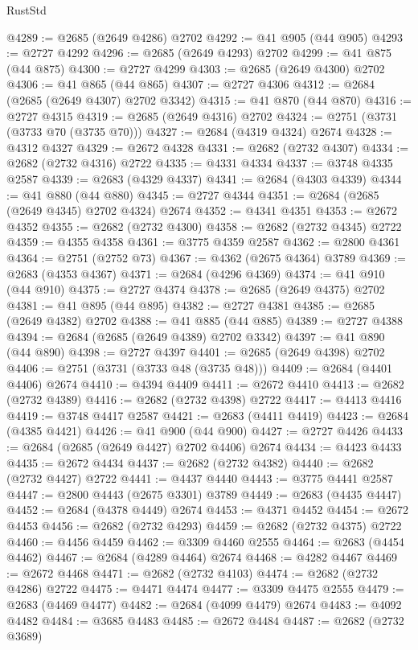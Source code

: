 \begin{lexlean}{RustStd}
\begin{coremodule}
{\begin{coremodule}
{{{{{{{{{{{{{{{{{{{{{{{{{{@4289 := @2685 (@2649 @4286) @2702
@4292 := @41 @905 (@44 @905)
@4293 := @2727 @4292
@4296 := @2685 (@2649 @4293) @2702
@4299 := @41 @875 (@44 @875)
@4300 := @2727 @4299
@4303 := @2685 (@2649 @4300) @2702
@4306 := @41 @865 (@44 @865)
@4307 := @2727 @4306
@4312 := @2684 (@2685 (@2649 @4307) @2702 @3342)
@4315 := @41 @870 (@44 @870)
@4316 := @2727 @4315
@4319 := @2685 (@2649 @4316) @2702
@4324 := @2751 (@3731 (@3733 @70 (@3735 @70)))
@4327 := @2684 (@4319 @4324) @2674
@4328 := @4312 @4327
@4329 := @2672 @4328
@4331 := @2682 (@2732 @4307)
@4334 := @2682 (@2732 @4316) @2722
@4335 := @4331 @4334
@4337 := @3748 @4335 @2587
@4339 := @2683 (@4329 @4337)
@4341 := @2684 (@4303 @4339)
@4344 := @41 @880 (@44 @880)
@4345 := @2727 @4344
@4351 := @2684 (@2685 (@2649 @4345) @2702 @4324) @2674
@4352 := @4341 @4351
@4353 := @2672 @4352
@4355 := @2682 (@2732 @4300)
@4358 := @2682 (@2732 @4345) @2722
@4359 := @4355 @4358
@4361 := @3775 @4359 @2587
@4362 := @2800 @4361
@4364 := @2751 (@2752 @73)
@4367 := @4362 (@2675 @4364) @3789
@4369 := @2683 (@4353 @4367)
@4371 := @2684 (@4296 @4369)
@4374 := @41 @910 (@44 @910)
@4375 := @2727 @4374
@4378 := @2685 (@2649 @4375) @2702
@4381 := @41 @895 (@44 @895)
@4382 := @2727 @4381
@4385 := @2685 (@2649 @4382) @2702
@4388 := @41 @885 (@44 @885)
@4389 := @2727 @4388
@4394 := @2684 (@2685 (@2649 @4389) @2702 @3342)
@4397 := @41 @890 (@44 @890)
@4398 := @2727 @4397
@4401 := @2685 (@2649 @4398) @2702
@4406 := @2751 (@3731 (@3733 @48 (@3735 @48)))
@4409 := @2684 (@4401 @4406) @2674
@4410 := @4394 @4409
@4411 := @2672 @4410
@4413 := @2682 (@2732 @4389)
@4416 := @2682 (@2732 @4398) @2722
@4417 := @4413 @4416
@4419 := @3748 @4417 @2587
@4421 := @2683 (@4411 @4419)
@4423 := @2684 (@4385 @4421)
@4426 := @41 @900 (@44 @900)
@4427 := @2727 @4426
@4433 := @2684 (@2685 (@2649 @4427) @2702 @4406) @2674
@4434 := @4423 @4433
@4435 := @2672 @4434
@4437 := @2682 (@2732 @4382)
@4440 := @2682 (@2732 @4427) @2722
@4441 := @4437 @4440
@4443 := @3775 @4441 @2587
@4447 := @2800 @4443 (@2675 @3301) @3789
@4449 := @2683 (@4435 @4447)
@4452 := @2684 (@4378 @4449) @2674
@4453 := @4371 @4452
@4454 := @2672 @4453
@4456 := @2682 (@2732 @4293)
@4459 := @2682 (@2732 @4375) @2722
@4460 := @4456 @4459
@4462 := @3309 @4460 @2555
@4464 := @2683 (@4454 @4462)
@4467 := @2684 (@4289 @4464) @2674
@4468 := @4282 @4467
@4469 := @2672 @4468
@4471 := @2682 (@2732 @4103)
@4474 := @2682 (@2732 @4286) @2722
@4475 := @4471 @4474
@4477 := @3309 @4475 @2555
@4479 := @2683 (@4469 @4477)
@4482 := @2684 (@4099 @4479) @2674
@4483 := @4092 @4482
@4484 := @3685 @4483
@4485 := @2672 @4484
@4487 := @2682 (@2732 @3689)
}}}}}}}}}}}}}}}}}}}}}}}}}}
\end{coremodule}}
\end{coremodule}
\end{lexlean}
